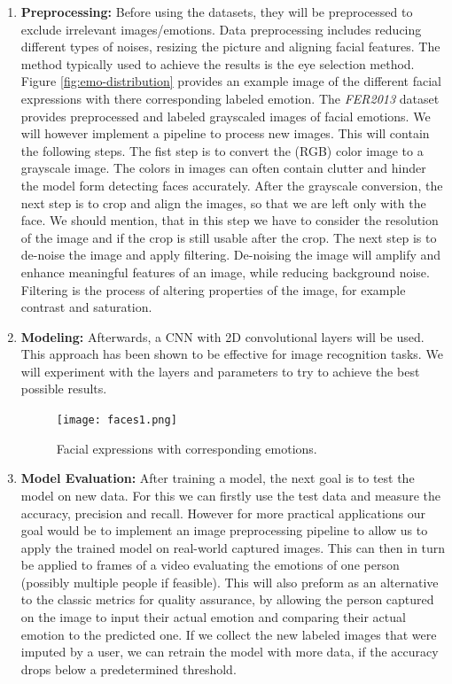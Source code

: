\begin{enumerate}
\item \textbf{Preprocessing:}
Before using the datasets, they will be preprocessed to exclude irrelevant images/emotions. Data preprocessing includes reducing different types of noises, resizing the picture and aligning facial features. The method typically used to achieve the results is the eye selection method. Figure \ref{fig:emo-distribution} provides an example image of the different facial expressions with there corresponding labeled emotion. 
The \textit{FER2013} dataset provides preprocessed and labeled grayscaled images of facial emotions. We will however implement a pipeline to process new images. This will contain the following steps. The fist step is to convert the (RGB) color image to a grayscale image. The colors in images can often contain clutter and  hinder the model form detecting faces accurately. After the grayscale conversion, the next step is to crop and align the images, so that we are left only with the face. We should mention, that in this step we have to consider the resolution of the image and if the crop is still usable after the crop. The next step is to de-noise the image and apply filtering. De-noising the image will amplify and enhance meaningful features of an image, while reducing background noise.   Filtering is the process of altering properties of the image, for example contrast and saturation.

\item \textbf{Modeling:}
Afterwards, a CNN with 2D convolutional layers will be used. This approach has been shown to be effective for image recognition tasks. We will experiment with the layers and parameters to try to achieve the best possible results. 

\begin{figure}[h]
\centering
\texttt{[image: faces1.png]}\\
\caption{Facial expressions with corresponding emotions. \cite{FER2013}}\label{fig:faces}
\end{figure}

\newpage
\item \textbf{Model Evaluation:}
After training a model, the next goal is to test the model on new data. For this we can firstly use the test data and measure the accuracy, precision and recall. However for more practical applications our goal would be to implement an image preprocessing pipeline to allow us to apply the trained model on real-world captured images. This can then in turn be applied to frames of a video evaluating the emotions of one person (possibly multiple people if feasible). This will also preform as an alternative to the classic metrics for quality assurance, by allowing the person captured on the image to input their actual emotion and comparing their actual emotion to the predicted one. If we collect the new labeled images that were imputed by a user, we can retrain the model with more data, if the accuracy drops below a predetermined threshold.


\end{enumerate}
